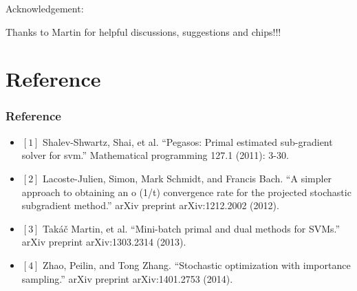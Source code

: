 \begin{frame}

Acknowledgement:

Thanks to Martin for helpful discussions, suggestions and chips!!!
\end{frame}

\section{Reference}
\begin{frame}[fragile]
\frametitle{Reference}
\begin{itemize}
\item[] $\left[1\right]$ Shalev-Shwartz, Shai, et al. ``Pegasos: Primal estimated sub-gradient solver for svm.'' Mathematical programming 127.1 (2011): 3-30. 

\item[] $\left[2\right]$ Lacoste-Julien, Simon, Mark Schmidt, and Francis Bach. ``A simpler approach to obtaining an o (1/t) convergence rate for the projected stochastic subgradient method.'' arXiv preprint arXiv:1212.2002 (2012).

\item[] $\left[3\right]$  Tak\'a\v{c} Martin, et al. ``Mini-batch primal and dual methods for SVMs.'' arXiv preprint arXiv:1303.2314 (2013).
\item[] $\left[4\right]$ Zhao, Peilin, and Tong Zhang. ``Stochastic optimization with importance sampling.'' arXiv preprint arXiv:1401.2753 (2014).
\end{itemize}
\end{frame}

